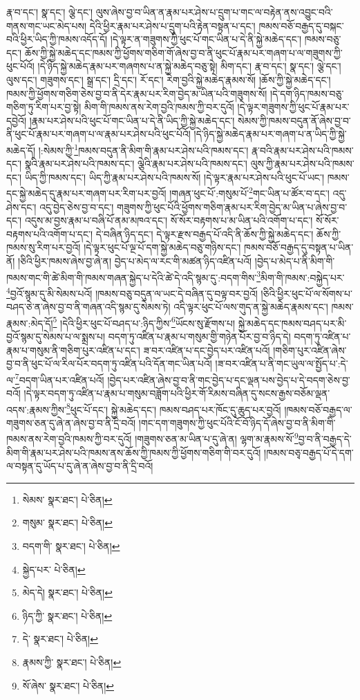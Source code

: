 རྣ་བ་དང་། སྣ་དང་། ལྕེ་དང་། ལུས་ཞེས་བྱ་བ་ཡིན་ན་རྣམ་པར་ཤེས་པ་དྲུག་པ་གང་ལ་བརྟེན་ནས་འབྱུང་བའི་གནས་གང་ཡང་མེད་པས། དེའི་ཕྱིར་རྣམ་པར་ཤེས་པ་དྲུག་པའི་རྟེན་བསྟན་པ་དང་། ཁམས་བཅོ་བརྒྱད་དུ་བསྐང་བའི་ཕྱིར་ཡིད་ཀྱི་ཁམས་འདོད་དོ། །དེ་ལྟར་ན་གཟུགས་ཀྱི་ཕུང་པོ་གང་ཡིན་པ་དེ་ནི་སྐྱེ་མཆེད་དང་། ཁམས་བཅུ་དང་། ཆོས་ཀྱི་སྐྱེ་མཆེད་དང་ཁམས་ཀྱི་ཕྱོགས་གཅིག་གོ་ཞེས་བྱ་བ་ནི་ཕུང་པོ་རྣམ་པར་གཞག་པ་ལ་གཟུགས་ཀྱི་ཕུང་པོའོ། །དེ་ཉིད་སྐྱེ་མཆེད་རྣམ་པར་གཞགས་པ་ན་སྐྱེ་མཆེད་བཅུ་སྟེ། མིག་དང་། རྣ་བ་དང་། སྣ་དང་། ལྕེ་དང་། ལུས་དང་། གཟུགས་དང་། སྒྲ་དང་། དྲི་དང་། རོ་དང་། རེག་བྱའི་སྐྱེ་མཆེད་རྣམས་སོ། །ཆོས་ཀྱི་སྐྱེ་མཆེད་དང་། ཁམས་ཀྱི་ཕྱོགས་གཅིག་ཅེས་བྱ་བ་ནི་དེར་རྣམ་པར་རིག་བྱེད་མ་ཡིན་པའི་གཟུགས་སོ། །དེ་དག་ཉིད་ཁམས་བཅུ་གཅིག་ཏུ་རིག་པར་བྱ་སྟེ། མིག་གི་ཁམས་ནས་རེག་བྱའི་ཁམས་ཀྱི་བར་དུའོ། །དེ་ལྟར་གཟུགས་ཀྱི་ཕུང་པོ་རྣམ་པར་དབྱེའོ། །རྣམ་པར་ཤེས་པའི་ཕུང་པོ་གང་ཡིན་པ་དེ་ནི་ཡིད་ཀྱི་སྐྱེ་མཆེད་དང་། སེམས་ཀྱི་ཁམས་བདུན་ནོ་ཞེས་བྱ་བ་ནི་ཕུང་པོ་རྣམ་པར་གཞག་པ་ལ་རྣམ་པར་ཤེས་པའི་ཕུང་པོའོ། །དེ་ཉིད་སྐྱེ་མཆེད་རྣམ་པར་གཞག་པ་ན་ཡིད་ཀྱི་སྐྱེ་མཆེད་དོ། །:སེམས་ཀྱི་\footnote{སེམས་  སྣར་ཐང་།  པེ་ཅིན། }ཁམས་བདུན་ནི་མིག་གི་རྣམ་པར་ཤེས་པའི་ཁམས་དང་། རྣ་བའི་རྣམ་པར་ཤེས་པའི་ཁམས་དང་། སྣའི་རྣམ་པར་ཤེས་པའི་ཁམས་དང་། ལྕེའི་རྣམ་པར་ཤེས་པའི་ཁམས་དང་། ལུས་ཀྱི་རྣམ་པར་ཤེས་པའི་ཁམས་དང་། ཡིད་ཀྱི་ཁམས་དང་། ཡིད་ཀྱི་རྣམ་པར་ཤེས་པའི་ཁམས་སོ། །དེ་ལྟར་རྣམ་པར་ཤེས་པའི་ཕུང་པོ་ཡང་། ཁམས་དང་སྐྱེ་མཆེད་དུ་རྣམ་པར་གཞག་པར་རིག་པར་བྱའོ། །གཞན་ཕུང་པོ་:གསུམ་པོ་\footnote{གསུམ་  སྣར་ཐང་།  པེ་ཅིན། }གང་ཡིན་པ་ཚོར་བ་དང་། འདུ་ཤེས་དང་། འདུ་བྱེད་ཅེས་བྱ་བ་དང་། གཟུགས་ཀྱི་ཕུང་པོའི་ཕྱོགས་གཅིག་རྣམ་པར་རིག་བྱེད་མ་ཡིན་པ་ཞེས་བྱ་བ་དང་། འདུས་མ་བྱས་རྣམ་པ་བཞི་པོ་ནམ་མཁའ་དང་། སོ་སོར་བརྟགས་པ་མ་ཡིན་པའི་འགོག་པ་དང་། སོ་སོར་བརྟགས་པའི་འགོག་པ་དང་། དེ་བཞིན་ཉིད་དང་། དེ་ལྟར་རྫས་བརྒྱད་པོ་འདི་ནི་ཆོས་ཀྱི་སྐྱེ་མཆེད་དང་། ཆོས་ཀྱི་ཁམས་སུ་རིག་པར་བྱའོ། །དེ་ལྟར་ཕུང་པོ་ལྔ་པོ་དག་སྐྱེ་མཆེད་བཅུ་གཉིས་དང་། ཁམས་བཅོ་བརྒྱད་དུ་བསྟན་པ་ཡིན་ནོ། །ཅིའི་ཕྱིར་ཁམས་ཞེས་བྱ་ཞེ་ན། བྱེད་པ་མེད་ལ་རང་གི་མཚན་ཉིད་འཛིན་པའོ། །བྱེད་པ་མེད་པ་ནི་མིག་གི་ཁམས་གང་གི་ཚེ་མིག་གི་ཁམས་གཞན་སྐྱེད་པ་དེའི་ཚེ་དེ་འདི་སྙམ་དུ་:བདག་གིས་\footnote{བདག་གི་  སྣར་ཐང་།  པེ་ཅིན། }མིག་གི་ཁམས་:བསྐྱེད་པར་\footnote{སྐྱེད་པར་  པེ་ཅིན། }བྱའོ་སྙམ་དུ་མི་སེམས་པའོ། །ཁམས་བཅུ་བདུན་ལ་ཡང་དེ་བཞིན་དུ་བལྟ་བར་བྱའོ། །ཅིའི་ཕྱིར་ཕུང་པོ་ལ་སོགས་པ་བཤད་ཅེ་ན་ཞེས་བྱ་བ་ནི་གཞན་འདི་སྙམ་དུ་སེམས་ཏེ། འདི་ལྟར་ཕུང་པོ་ལས་གུད་ན་སྐྱེ་མཆེད་རྣམས་དང་། ཁམས་རྣམས་:མེད་དོ།\footnote{མེད་དེ།  སྣར་ཐང་།  པེ་ཅིན། } །དེའི་ཕྱིར་ཕུང་པོ་བཤད་པ་:ཉིད་ཀྱིས་\footnote{ཉིད་ཀྱི་  སྣར་ཐང་།  པེ་ཅིན། }ཡོངས་སུ་རྫོགས་པ། སྐྱེ་མཆེད་དང་ཁམས་བཤད་པར་མི་བྱའོ་སྙམ་དུ་སེམས་པ་ལ་སྨྲས་པ། བདག་ཏུ་འཛིན་པ་རྣམ་པ་གསུམ་གྱི་གཉེན་པོར་བྱ་བ་ཉིད་དེ། བདག་ཏུ་འཛིན་པ་རྣམ་པ་གསུམ་ནི་གཅིག་པུར་འཛིན་པ་དང་། ཟ་བར་འཛིན་པ་དང་བྱེད་པར་འཛིན་པའོ། །གཅིག་པུར་འཛིན་ཞེས་བྱ་བ་ནི་ཕུང་པོ་ལ་རིལ་པོར་བདག་ཏུ་འཛིན་པའི་དོན་གང་ཡིན་པའོ། །ཟ་བར་འཛིན་པ་ནི་གང་ཡུལ་ལ་སྤྱོད་པ་:དེ་ལ་\footnote{དེ་  སྣར་ཐང་།  པེ་ཅིན། }བདག་ཡིན་པར་འཛིན་པའོ། །བྱེད་པར་འཛིན་ཞེས་བྱ་བ་ནི་གང་བྱེད་པ་དང་ལྡན་པས་བྱེད་པ་དེ་བདག་ཅེས་བྱ་བའོ། །དེ་ལྟར་བདག་ཏུ་འཛིན་པ་རྣམ་པ་གསུམ་བཟློག་པའི་ཕྱིར་གོ་རིམས་བཞིན་དུ་སངས་རྒྱས་བཅོམ་ལྡན་འདས་:རྣམས་ཀྱིས་\footnote{རྣམས་ཀྱི་  སྣར་ཐང་།  པེ་ཅིན། }ཕུང་པོ་དང་། སྐྱེ་མཆེད་དང་། ཁམས་བཤད་པར་ཁོང་དུ་ཆུད་པར་བྱའོ། །ཁམས་བཅོ་བརྒྱད་ལ་གཟུགས་ཅན་དུ་ཞེ་ན་ཞེས་བྱ་བ་ནི་དྲི་བའོ། །གང་དག་གཟུགས་ཀྱི་ཕུང་པོའི་ངོ་བོ་ཉིད་དོ་ཞེས་བྱ་བ་ནི་མིག་གི་ཁམས་ནས་རེག་བྱའི་ཁམས་ཀྱི་བར་དུའོ། །གཟུགས་ཅན་མ་ཡིན་པ་དུ་ཞེ་ན། ལྷག་མ་རྣམས་སོ་\footnote{སོ་ཞེས་  སྣར་ཐང་།  པེ་ཅིན། }བྱ་བ་ནི་བརྒྱད་དེ་མིག་གི་རྣམ་པར་ཤེས་པའི་ཁམས་ནས་ཆོས་ཀྱི་ཁམས་ཀྱི་ཕྱོགས་གཅིག་གི་བར་དུའོ། །ཁམས་བཅྭ་བརྒྱད་པོ་དེ་དག་ལ་བསྟན་དུ་ཡོད་པ་དུ་ཞེ་ན་ཞེས་བྱ་བ་ནི་དྲི་བའོ། 